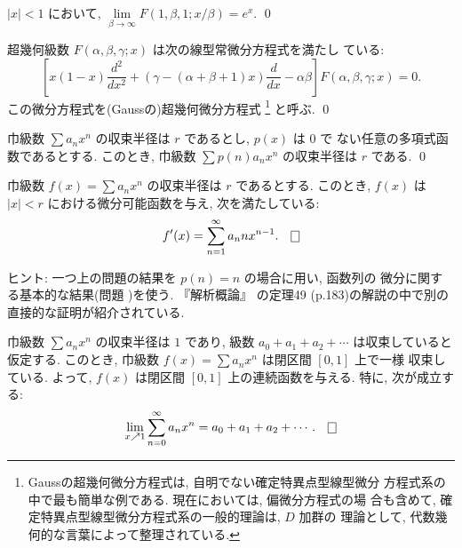 \documentclass[12pt,twoside]{jarticle}
\begin{document}
\begin{question}
  $|x|<1$ において, %
  $\lim\limits_{\beta\to\infty}F(1,\beta,1; x/\beta) = e^x$.
  \qed
\end{question}

\begin{question}[超幾何微分方程式]\label{q:hypergeom-eq}
  超幾何級数 $F(\alpha,\beta,\gamma;x)$ は次の線型常微分方程式を満たし
  ている:
  \[
    \left[
      x(1 - x) \frac{d^2}{dx^2}
      + (\gamma - (\alpha + \beta + 1) x) \frac{d}{dx}
      - \alpha\beta
    \right] F(\alpha,\beta,\gamma; x) = 0.
  \]%
  この微分方程式を(Gaussの)超幾何微分方程式%
  \footnote{Gaussの超幾何微分方程式は, 自明でない確定特異点型線型微分
    方程式系の中で最も簡単な例である. 現在においては, 偏微分方程式の場
    合も含めて, 確定特異点型線型微分方程式系の一般的理論は, $D$ 加群の
    理論として, 代数幾何的な言葉によって整理されている.}%
  と呼ぶ. \qed
\end{question}

\begin{question}
  巾級数 $\sum a_n x^n$ の収束半径は $r$ であるとし, $p(x)$ は $0$ で
  ない任意の多項式函数であるとする. %
  このとき, 巾級数 $\sum p(n)a_n x^n$ の収束半径は $r$ である. 
  \qed
\end{question}

\begin{question}
  巾級数 $f(x) = \sum a_n x^n$ の収束半径は $r$ であるとする. このとき,
  $f(x)$ は $|x| < r$ における微分可能函数を与え, 次を満たしている:
  \[
    f'(x) = \sum_{n=1}^\infty a_n n x^{n-1}. \qed
  \]
\end{question}

\noindent ヒント: 一つ上の問題の結果を $p(n)=n$ の場合に用い, 函数列の
微分に関する基本的な結果(問題 )を使う.  『解析概論』
の定理49 (p.183)の解説の中で別の直接的な証明が紹介されている.

\begin{question}[Abelの定理]\label{q:Abel-Th}\qstar{*}
  巾級数 $\sum a_n x^n$ の収束半径は $1$ であり, %
  級数 $a_0 + a_1 + a_2 + \cdots$ は収束していると仮定する.  %
  このとき, 巾級数 $f(x) = \sum a_n x^n$ は閉区間 $[0,1]$ 上で一様
  収束している. よって, $f(x)$ は閉区間 $[0,1]$ 上の連続函数を与える. 
  特に, 次が成立する:
  \[
    \lim_{x\nearrow 1} \sum_{n=0}^\infty a_n x^n
    =
    a_0 + a_1 + a_2 + \cdots.
  \qed
  \]
\end{question}
\end{document}

